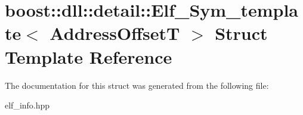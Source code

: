 \hypertarget{a01396}{}\section{boost\+:\+:dll\+:\+:detail\+:\+:Elf\+\_\+\+Sym\+\_\+template$<$ Address\+OffsetT $>$ Struct Template Reference}
\label{a01396}


The documentation for this struct was generated from the following file\+:\begin{DoxyCompactItemize}
\item 
elf\+\_\+info.\+hpp\end{DoxyCompactItemize}
